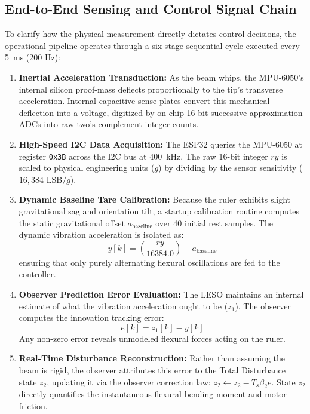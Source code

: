 \documentclass[conference]{IEEEtran}
\begin{document}
\subsection{End-to-End Sensing and Control Signal Chain}
To clarify how the physical measurement directly dictates control decisions, the operational pipeline operates through a six-stage sequential cycle executed every 5~ms ($200\text{ Hz}$):
\begin{enumerate}
    \item \textbf{Inertial Acceleration Transduction:} As the beam whips, the MPU-6050's internal silicon proof-mass deflects proportionally to the tip's transverse acceleration. Internal capacitive sense plates convert this mechanical deflection into a voltage, digitized by on-chip 16-bit successive-approximation ADCs into raw two's-complement integer counts.
    \item \textbf{High-Speed I2C Data Acquisition:} The ESP32 queries the MPU-6050 at register \texttt{0x3B} across the I2C bus at 400~kHz. The raw 16-bit integer $ry$ is scaled to physical engineering units ($g$) by dividing by the sensor sensitivity ($16,384\text{ LSB}/g$).
    \item \textbf{Dynamic Baseline Tare Calibration:} Because the ruler exhibits slight gravitational sag and orientation tilt, a startup calibration routine computes the static gravitational offset $a_{\text{baseline}}$ over 40 initial rest samples. The dynamic vibration acceleration is isolated as:
    \begin{equation}
    y[k] = \left(\frac{ry}{16384.0}\right) - a_{\text{baseline}}
    \end{equation}
    ensuring that only purely alternating flexural oscillations are fed to the controller.
    \item \textbf{Observer Prediction Error Evaluation:} The LESO maintains an internal estimate of what the vibration acceleration ought to be ($z_1$). The observer computes the innovation tracking error:
    \begin{equation}
    e[k] = z_1[k] - y[k]
    \end{equation}
    Any non-zero error reveals unmodeled flexural forces acting on the ruler.
    \item \textbf{Real-Time Disturbance Reconstruction:} Rather than assuming the beam is rigid, the observer attributes this error to the Total Disturbance state $z_2$, updating it via the observer correction law: $z_2 \leftarrow z_2 - T_s \beta_2 e$. State $z_2$ directly quantifies the instantaneous flexural bending moment and motor friction.

\end{enumerate}
\end{document}
